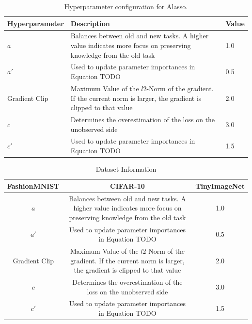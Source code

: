 \begin{table}[h!]
    \centering
    \begin{tabularx}{\textwidth}{X | X X } 
        \hline
        Hyperparameter & Description & Value \\ 
        \hline 
        $a$ & Balances between old and new tasks. A higher value indicates more focus
        on preserving knowledge from the old task & 1.0  \\ 
        $a'$ & Used to update parameter importances in Equation TODO & 0.5  \\
        Gradient Clip & Maximum Value of the $l2$-Norm of the gradient. If the current norm is larger, the
        gradient is clipped to that value & 2.0 \\ 
        $c$ & Determines the overestimation of the loss on the unobserved side & 3.0 \\
        $c'$ & Used to update parameter importances in Equation TODO & 1.5 \\
        \hline
    \end{tabularx}
    \caption{Hyperparameter configuration for Alasso.}
    \label{fig:AlassoParams}
\end{table}

\begin{table}[h!]
    \centering
    \begin{tabularx}{\textwidth}{c | c c } 
        \hline
         FashionMNIST & CIFAR-10 & TinyImageNet \\ 
        \hline 
        $a$ & Balances between old and new tasks. A higher value indicates more focus
        on preserving knowledge from the old task & 1.0  \\ 
        $a'$ & Used to update parameter importances in Equation TODO & 0.5  \\
        Gradient Clip & Maximum Value of the $l2$-Norm of the gradient. If the current norm is larger, the
        gradient is clipped to that value & 2.0 \\ 
        $c$ & Determines the overestimation of the loss on the unobserved side & 3.0 \\
        $c'$ & Used to update parameter importances in Equation TODO & 1.5 \\
        \hline
    \end{tabularx}
    \caption{Dataset Information}
    \label{fig:DatasetInformtion}
\end{table}

